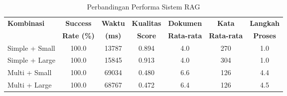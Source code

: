 
\begin{table}[h]
\centering
\caption{Perbandingan Performa Sistem RAG}
\label{tab:rag_comparison}
\begin{tabular}{|l|c|c|c|c|c|c|}
\hline
\textbf{Kombinasi} & \textbf{Success} & \textbf{Waktu} & \textbf{Kualitas} & \textbf{Dokumen} & \textbf{Kata} & \textbf{Langkah} \\
\textbf{} & \textbf{Rate (\%)} & \textbf{(ms)} & \textbf{Score} & \textbf{Rata-rata} & \textbf{Rata-rata} & \textbf{Proses} \\
\hline
Simple + Small & 100.0 & 13787 & 0.894 & 4.0 & 270 & 1.0 \\
Simple + Large & 100.0 & 15845 & 0.913 & 4.0 & 304 & 1.0 \\
Multi + Small & 100.0 & 69034 & 0.480 & 6.6 & 126 & 4.4 \\
Multi + Large & 100.0 & 68767 & 0.472 & 6.4 & 126 & 4.5 \\
\hline
\end{tabular}
\end{table}
